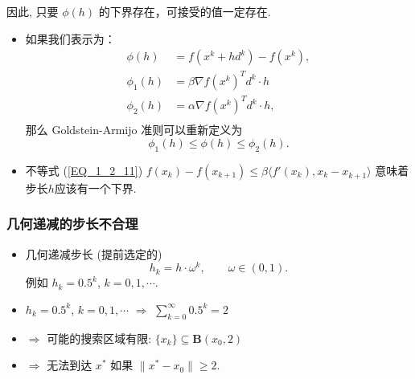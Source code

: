 \documentclass[handout]{beamer}
\begin{document}
\begin{frame}[allowframebreaks]
\begin{itemize}
因此, 只要 $\phi(h)$ 的下界存在，可接受的值一定存在.
\end{itemize}
\framebreak

\begin{itemize}
\item    如果我们表示为：
    $$
    \begin{aligned}
         \phi(h) & = f(x^k + h d^k) - f(x^k),\\
         \phi_1(h) &= \beta \nabla f(x^k)^T d^k \cdot h \\
         \phi_2(h) &= \alpha \nabla f(x^k)^T d^k \cdot h, \\
    \end{aligned}
    $$
    那么 Goldstein-Armijo 准则可以重新定义为
    $$
        \phi_1(h)  \leq \phi(h) \leq \phi_2(h).
    $$
 \item 不等式 (\ref{EQ_1_2_11}) $   f(x_k) - f(x_{k+1})  \leq \beta \langle f'(x_k), x_k - x_{k+1}^{} \rangle$
    意味着步长$h$应该有一个下界.
 \end{itemize}

\end{frame}


\begin{frame}
  \frametitle{几何递减的步长不合理}

\begin{itemize}
  \item 几何递减步长 (提前选定的)
  $$
  h_k = h\cdot \omega^k,\qquad \omega\in (0,1).
  $$
例如 $h_k = 0.5^k$, $k=0,1,\cdots$.

\end{itemize}

\begin{itemize}
\item $h_k = 0.5^k$, $k=0,1,\cdots$ $\Rightarrow$
  $\sum_{k=0}^{\infty} 0.5^k = 2$

\item  $\Rightarrow$ 可能的搜索区域有限: $\{x_k\} \subseteq   \mathbf{B}(x_0, 2)$

\item   $\Rightarrow$ 无法到达 $x^*$ 如果 $\|x^* - x_0 \|\geq 2$.

\end{itemize}
\end{frame}
\end{document}
